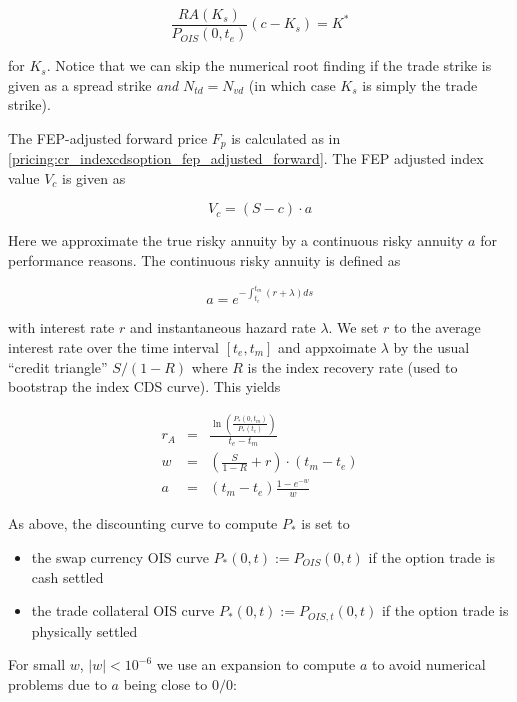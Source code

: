 \begin{equation}
\frac{RA(K_s)}{P_{OIS}(0,t_e)} (c - K_s) = K^*
\end{equation}

for $K_s$. Notice that we can skip the numerical root finding if the trade strike is given as a spread strike {\em and}
$N_{td} = N_{vd}$ (in which case $K_s$ is simply the trade strike).

The FEP-adjusted forward price $F_p$ is calculated as in \ref{pricing:cr_indexcdsoption_fep_adjusted_forward}. The FEP
adjusted index value $V_c$ is given as

\begin{equation}
V_c = (S-c)\cdot a
\end{equation}

Here we approximate the true risky annuity by a continuous risky annuity $a$ for performance reasons. The continuous
risky annuity is defined as

\begin{equation}
a = e^{-\int_{t_e}^{t_m} (r + \lambda) ds}
\end{equation}

with interest rate $r$ and instantaneous hazard rate $\lambda$. We set $r$ to the average interest rate over the time
interval $[t_e, t_m]$ and appxoimate $\lambda$ by the usual ``credit triangle'' $S/(1-R)$ where $R$ is the index
recovery rate (used to bootstrap the index CDS curve). This yields

\begin{eqnarray}
r_A &=& \frac{\ln \left( \frac{P_{*}(0,t_m)}{P_{*}(t_e)} \right)}{t_e-t_m} \\
w &=& \left(\frac{S}{1-R} + r \right) \cdot (t_m-t_e) \\
a &=& \left(t_m-t_e\right) \frac{1 - e^{-w}}{w}
\end{eqnarray}

As above, the discounting curve to compute $P_{*}$ is set to

\begin{itemize}
\item the swap currency OIS curve $P_{*}(0,t) := P_{OIS}(0,t)$ if the option trade is cash settled
\item the trade collateral OIS curve $P_{*}(0,t) := P_{OIS,t}(0,t)$ if the option trade is physically settled
\end{itemize}

For small $w$, $|w| < 10^{-6}$ we use an expansion to compute $a$ to avoid numerical problems due to $a$ being close to
$0/0$:


